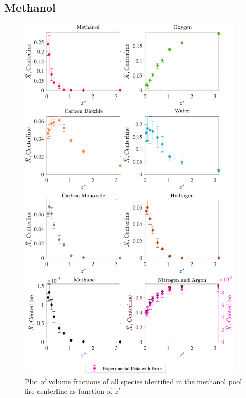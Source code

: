 \documentclass[12pt]{article}
\begin{document}
\subsection{Methanol}
\label{ssec:Methanol_ALL_Vol_Frac}
\begin{figure}[!h]
	\centering
\includegraphics[width=10.75cm,keepaspectratio]{Methanol_MOL_FRAC_Plot_2.pdf}
	\caption[Volume fractions of major species in the methanol plume]{Plot of volume fractions of all species identified in the methanol pool fire centerline as function of $z^{*}$}
	\label{fig:Methanol_VOL_Frac_Major}
\end{figure}
\pagebreak

\end{document}
